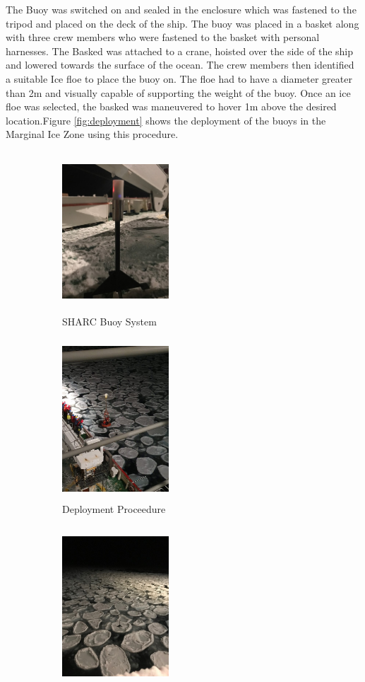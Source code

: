 The  Buoy was switched on and sealed in the enclosure which was fastened to the tripod and placed on the deck of the ship. The buoy was placed in a basket along with three crew members who were fastened to the basket with personal harnesses. The Basked was attached to a crane, hoisted over the side of the ship and lowered towards the surface of the ocean. The crew members then identified a suitable Ice floe to place the buoy on. The floe had to have a diameter greater than 2m and visually capable of supporting the weight of the buoy. Once an ice floe was selected, the basked was maneuvered to hover 1m above the desired location.Figure \ref{fig:deployment}  shows the deployment of the buoys in the Marginal Ice Zone using this procedure. 

\begin{figure}[H]
    \centering
    \begin{subfigure}[h]{0.3\textwidth}
    \includegraphics[width = 4cm,height = 6cm]{buoy.jpg}
    \caption{SHARC Buoy System}
    \end{subfigure}%
    \begin{subfigure}[h]{0.3\textwidth}
    \includegraphics[width = 4cm,height=6cm]{basket.jpg}
    \caption{Deployment Proceedure}
    \end{subfigure}%
    \begin{subfigure}[h]{0.3\textwidth}
    \includegraphics[width = 4cm,height=6cm]{deployment.jpg}

\end{subfigure}
\end{figure}

